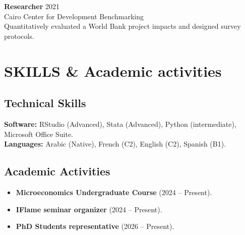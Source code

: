\documentclass[a4paper,9pt]{extarticle}
\begin{document}
    \noindent
    \textbf{Researcher} \hfill 2021 \\ 
    Cairo Center for Development Benchmarking \\ 
    Quantitatively evaluated a World Bank project impacts and designed survey protocols.

\section*{SKILLS \& Academic activities}

    \subsection*{Technical Skills}
        \textbf{Software:} RStudio (Advanced), Stata (Advanced), Python (intermediate), Microsoft Office Suite. \\
        \textbf{Languages:} Arabic (Native), French (C2), English (C2), Spanish (B1).

    \subsection*{Academic Activities}
        \begin{itemize}
            
            \item \textbf{Microeconomics Undergraduate Course} (2024 -- Present).
        
        
            \item \textbf{IFlame seminar organizer} (2024 -- Present).
        
            \item \textbf{PhD Students representative} (2026 -- Present).
        \end{itemize}
\end{document}

